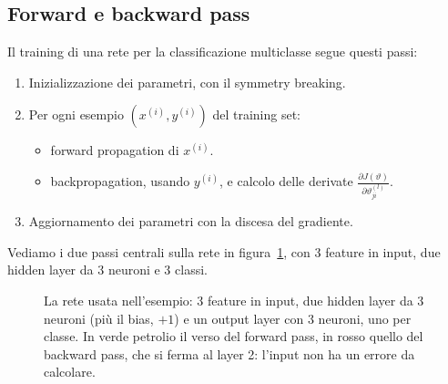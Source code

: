 \subsection{Forward e backward pass}
Il training di una rete per la classificazione multiclasse segue questi passi:
\begin{enumerate}
    \item Inizializzazione dei parametri, con il symmetry breaking.
    \item Per ogni esempio $(x^{(i)}, y^{(i)})$ del training set:
    \begin{itemize}
        \item forward propagation di $x^{(i)}$.
        \item backpropagation, usando $y^{(i)}$, e calcolo delle derivate $\frac{\partial J(\vartheta)}{\partial \vartheta_{ji}^{(l)}}$.
    \end{itemize}
    \item Aggiornamento dei parametri con la discesa del gradiente.
\end{enumerate}
Vediamo i due passi centrali sulla rete in figura~\ref{fig:rete-4-layer}, con 3 feature in input, due hidden layer da 3 neuroni e 3 classi.

\begin{figure}[htbp]
\centering
{}
\caption{La rete usata nell'esempio: 3 feature in input, due hidden layer da 3 neuroni (più il bias, $+1$) e un output layer con 3 neuroni, uno per classe. In verde petrolio il verso del forward pass, in rosso quello del backward pass, che si ferma al layer 2: l'input non ha un errore da calcolare.}
\label{fig:rete-4-layer}
\end{figure}

